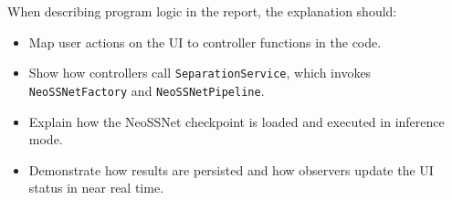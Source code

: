 \documentclass[12pt,a4paper]{report}
\begin{document}
When describing program logic in the report, the explanation should:
\begin{itemize}[nosep]
  \item Map user actions on the UI to controller functions in the code.
  \item Show how controllers call \texttt{SeparationService}, which invokes \texttt{NeoSSNetFactory} and \texttt{NeoSSNetPipeline}.
  \item Explain how the NeoSSNet checkpoint is loaded and executed in inference mode.
  \item Demonstrate how results are persisted and how observers update the UI status in near real time.
\end{itemize}

\clearpage


\end{document}
